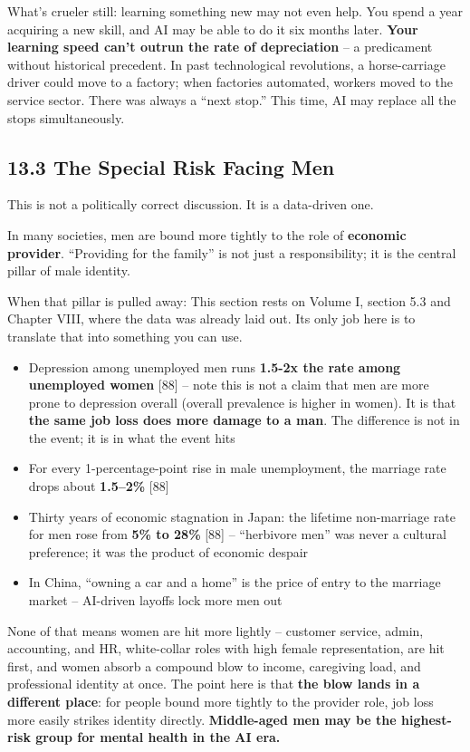 \documentclass[11pt,a4paper]{article}
\begin{document}
What's crueler still: learning something new may not even help. You spend a year acquiring a new skill, and AI may be able to do it six months later. \textbf{Your learning speed can't outrun the rate of depreciation} -- a predicament without historical precedent. In past technological revolutions, a horse-carriage driver could move to a factory; when factories automated, workers moved to the service sector. There was always a ``next stop.'' This time, AI may replace all the stops simultaneously.

\subsection{13.3 The Special Risk Facing Men}

This is not a politically correct discussion. It is a data-driven one.

In many societies, men are bound more tightly to the role of \textbf{economic provider}. ``Providing for the family'' is not just a responsibility; it is the central pillar of male identity.

When that pillar is pulled away: This section rests on Volume I, section 5.3 and Chapter VIII, where the data was already laid out. Its only job here is to translate that into something you can use.

\begin{itemize}
  \item Depression among unemployed men runs \textbf{1.5-2x the rate among unemployed women}{} [88] -- note this is not a claim that men are more prone to depression overall (overall prevalence is higher in women). It is that \textbf{the same job loss does more damage to a man}. The difference is not in the event; it is in what the event hits
  \item For every 1-percentage-point rise in male unemployment, the marriage rate drops about \textbf{1.5--2\%}{} [88]
  \item Thirty years of economic stagnation in Japan: the lifetime non-marriage rate for men rose from \textbf{5\% to 28\%}{} [88] -- ``herbivore men'' was never a cultural preference; it was the product of economic despair
  \item In China, ``owning a car and a home'' is the price of entry to the marriage market -- AI-driven layoffs lock more men out
\end{itemize}

None of that means women are hit more lightly -- customer service, admin, accounting, and HR, white-collar roles with high female representation, are hit first, and women absorb a compound blow to income, caregiving load, and professional identity at once. The point here is that \textbf{the blow lands in a different place}: for people bound more tightly to the provider role, job loss more easily strikes identity directly. \textbf{Middle-aged men may be the highest-risk group for mental health in the AI era.}
\end{document}
